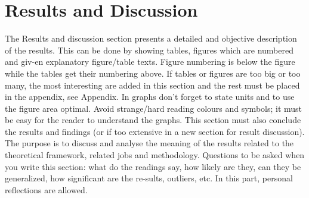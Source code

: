 
\clearpage

\fancyhead{} %

\chapter{Results and Discussion}\thispagestyle{fancy}
The Results and discussion section presents a detailed and objective description of the results. This can be done by showing tables, figures which are numbered and giv-en explanatory figure/table texts. Figure numbering is below the figure while the tables get their numbering above.  If tables or figures are too big or too many, the most interesting are added in this section and the rest must be placed in the appendix, see Appendix. In graphs don’t forget to state units and to use the figure area optimal. Avoid strange/hard reading colours and symbols; it must be easy for the reader to understand the graphs. This section must also conclude the results and findings (or if too extensive in a new section for result discussion). The purpose is to discuss and analyse the meaning of the results related to the theoretical framework, related jobs and methodology. Questions to be asked when you write this section: what do the readings say, how likely are they, can they be generalized, how significant are the re-sults, outliers, etc. In this part, personal reflections are allowed.

\begin{comment}
To write notes or comments that isn't published in the pdf.
\end{comment}
